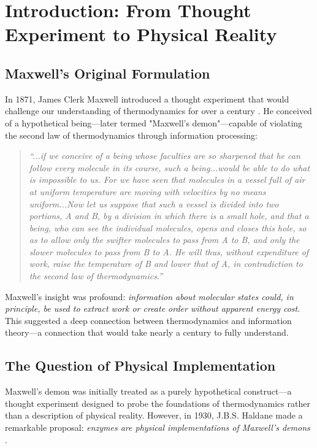 \documentclass[12pt,a4paper]{article}
\begin{document}
\section{Introduction: From Thought Experiment to Physical Reality}

\subsection{Maxwell's Original Formulation}

In 1871, James Clerk Maxwell introduced a thought experiment that would challenge our understanding of thermodynamics for over a century \cite{maxwell1871theory}. He conceived of a hypothetical being—later termed "Maxwell's demon"—capable of violating the second law of thermodynamics through information processing:

\begin{quote}
\textit{``...if we conceive of a being whose faculties are so sharpened that he can follow every molecule in its course, such a being...would be able to do what is impossible to us. For we have seen that molecules in a vessel full of air at uniform temperature are moving with velocities by no means uniform...Now let us suppose that such a vessel is divided into two portions, A and B, by a division in which there is a small hole, and that a being, who can see the individual molecules, opens and closes this hole, so as to allow only the swifter molecules to pass from A to B, and only the slower molecules to pass from B to A. He will thus, without expenditure of work, raise the temperature of B and lower that of A, in contradiction to the second law of thermodynamics.''}
\end{quote}

Maxwell's insight was profound: \textit{information about molecular states could, in principle, be used to extract work or create order without apparent energy cost}. This suggested a deep connection between thermodynamics and information theory—a connection that would take nearly a century to fully understand.

\subsection{The Question of Physical Implementation}

Maxwell's demon was initially treated as a purely hypothetical construct—a thought experiment designed to probe the foundations of thermodynamics rather than a description of physical reality. However, in 1930, J.B.S. Haldane made a remarkable proposal: \textit{enzymes are physical implementations of Maxwell's demons} \cite{haldane1930enzymes}.
\end{document}
